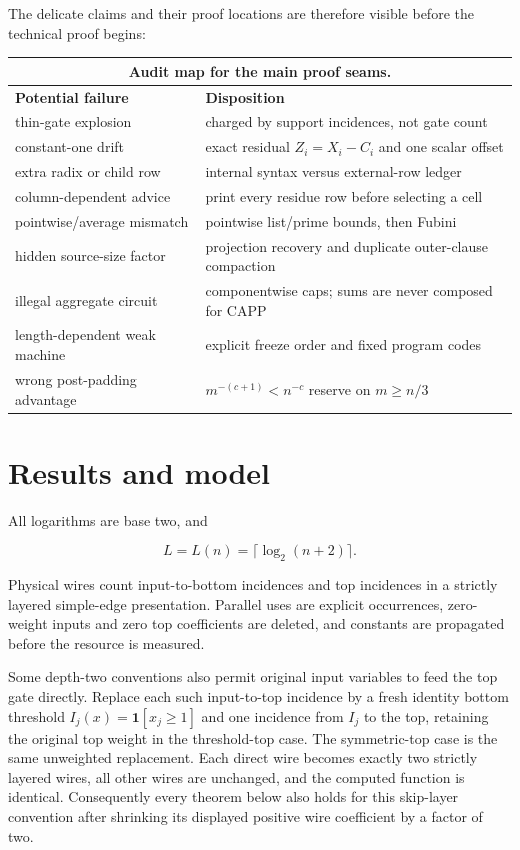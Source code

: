 \documentclass[11pt,letterpaper]{article}
\theoremstyle{definition}
\theoremstyle{remark}
\begin{document}
The delicate claims and their proof locations are therefore visible
before the technical proof begins:

\begin{center}
\small
\begin{tabularx}{\textwidth}{@{}p{}X@{}}
\multicolumn{2}{c}{\textbf{Audit map for the main proof seams.}}\\[0.4em]
\toprule
\textbf{Potential failure} & \textbf{Disposition} \\
\midrule
thin-gate explosion & charged by support incidences, not gate count \\
constant-one drift & exact residual \(Z_i=X_i-C_i\) and one scalar
offset \\
extra radix or child row & internal syntax versus external-row ledger \\
column-dependent advice & print every residue row before selecting a
cell \\
pointwise/average mismatch & pointwise list/prime bounds, then Fubini \\
hidden source-size factor & projection recovery and duplicate
outer-clause compaction \\
illegal aggregate circuit & componentwise caps; sums are never composed
for CAPP \\
length-dependent weak machine & explicit freeze order and fixed program
codes \\
wrong post-padding advantage & \(m^{-(c+1)}<n^{-c}\) reserve on
\(m\ge n/3\) \\
\bottomrule
\end{tabularx}
\end{center}

\section{Results and model}\label{sec:results-model}

All logarithms are base two, and

\[
L=L(n)=\lceil\log_2(n+2)\rceil.
\]

Physical wires count input-to-bottom incidences and top incidences in a
strictly layered simple-edge presentation. Parallel uses are explicit
occurrences, zero-weight inputs and zero top coefficients are deleted,
and constants are propagated before the resource is measured.

Some depth-two conventions also permit original input variables to feed
the top gate directly. Replace each such input-to-top incidence by a
fresh identity bottom threshold \(I_j(x)=\mathbf1[x_j\ge1]\) and one
incidence from \(I_j\) to the top, retaining the original top weight in
the threshold-top case. The symmetric-top case is the same unweighted
replacement. Each direct wire becomes exactly two strictly layered
wires, all other wires are unchanged, and the computed function is
identical. Consequently every theorem below also holds for this
skip-layer convention after shrinking its displayed positive wire
coefficient by a factor of two.
\end{document}
